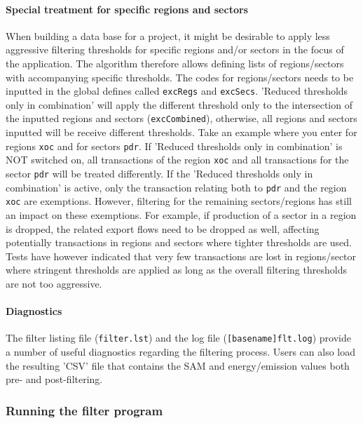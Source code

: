\paragraph{Special treatment for specific regions and sectors}

When building a data base for a project, it might be desirable to apply less
aggressive filtering thresholds for specific regions and/or sectors in the focus
of the application. The algorithm therefore allows defining lists of
regions/sectors with accompanying specific thresholds. The codes for
regions/sectors needs to be inputted in the global defines called
\texttt{excRegs} and \texttt{excSecs}. 'Reduced thresholds only in combination'
will apply the different threshold only to the intersection of the inputted
regions and sectors (\texttt{excCombined}), otherwise, all regions and sectors
inputted will be receive different thresholds. Take an example where you enter
for regions \texttt{xoc} and for sectors \texttt{pdr}. If 'Reduced thresholds
only in combination' is NOT switched on, all transactions of the region
\texttt{xoc} and all transactions for the sector \texttt{pdr} will be treated
differently. If the 'Reduced thresholds only in combination' is active, only the
transaction relating both to \texttt{pdr} and the region \texttt{xoc} are
exemptions. However, filtering for the remaining sectors/regions has still an
impact on these exemptions. For example, if production of a sector in a region
is dropped, the related export flows need to be dropped as well, affecting
potentially transactions in regions and sectors where tighter thresholds are
used. Tests have however indicated that very few transactions are lost in
regions/sector where stringent thresholds are applied as long as the overall
filtering thresholds are not too aggressive.

\paragraph{Diagnostics}

The filter listing file (\texttt{filter.lst}) and the log file
(\texttt{[basename]flt.log}) provide a number of useful diagnostics regarding
the filtering process. Users can also load the resulting 'CSV' file that
contains the SAM and energy/emission values both pre- and post-filtering.

\subsubsection{Running the filter program}

